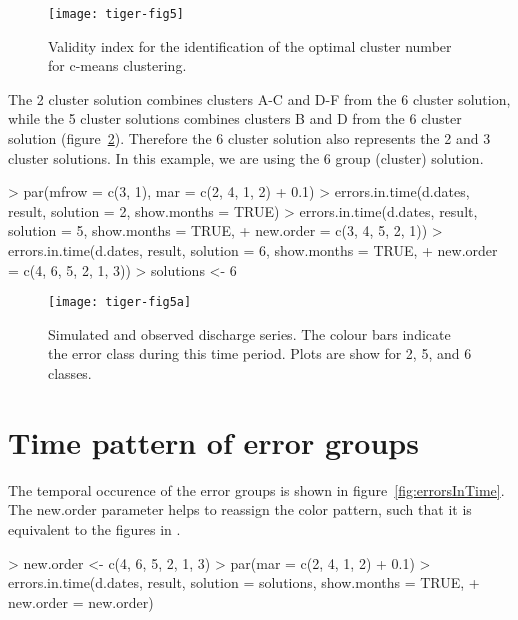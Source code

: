 \documentclass[a4paper]{article}
\begin{document}
\begin{figure}
\begin{center}
\texttt{[image: tiger-fig5]}
\end{center}
\caption{Validity index for the identification of the optimal cluster number
for c-means clustering.}
\label{fig:validity}
\end{figure}

The 2
cluster solution combines clusters A-C and D-F from the 6 cluster
solution, while the 5 cluster solutions combines clusters B and D from
the 6 cluster solution (figure~\ref{fig:numberClusters}).
Therefore the 6 cluster solution also represents the 2
and 3 cluster solutions. In this example, we are using the 6
group (cluster) solution. 

\begin{Schunk}
\begin{Sinput}
> par(mfrow = c(3, 1), mar = c(2, 4, 1, 2) + 0.1)
> errors.in.time(d.dates, result, solution = 2, show.months = TRUE)
> errors.in.time(d.dates, result, solution = 5, show.months = TRUE, 
+     new.order = c(3, 4, 5, 2, 1))
> errors.in.time(d.dates, result, solution = 6, show.months = TRUE, 
+     new.order = c(4, 6, 5, 2, 1, 3))
> solutions <- 6
\end{Sinput}
\end{Schunk}
\begin{figure}
\begin{center}
\texttt{[image: tiger-fig5a]}
\end{center}
\caption{Simulated and observed discharge series. The colour bars indicate
the error class during this time period. Plots are show for 2, 5, and
6 classes.}
\label{fig:numberClusters}
\end{figure}


\section{Time pattern of error groups}
The temporal occurence of the error groups is shown in
figure~\ref{fig:errorsInTime}. The new.order parameter helps to
reassign the color pattern, such that it is equivalent to the figures
in \citep{Reusser2008a}.

\begin{Schunk}
\begin{Sinput}
> new.order <- c(4, 6, 5, 2, 1, 3)
> par(mar = c(2, 4, 1, 2) + 0.1)
> errors.in.time(d.dates, result, solution = solutions, show.months = TRUE, 
+     new.order = new.order)
\end{Sinput}
\end{Schunk}
\end{document}
